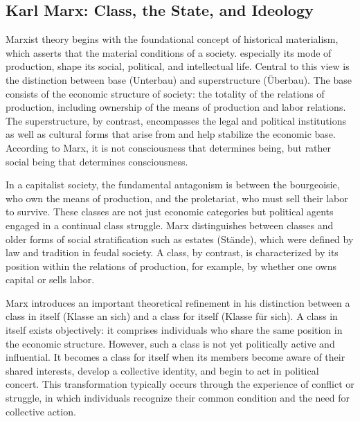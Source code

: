 \documentclass[12pt]{article}
\begin{document}
\subsection*{Karl Marx: Class, the State, and Ideology}

Marxist theory begins with the foundational concept of historical materialism, which asserts that the material conditions of a society. especially its mode of production, shape its social, political, and intellectual life. Central to this view is the distinction between base (Unterbau) and superstructure (Überbau). The base consists of the economic structure of society: the totality of the relations of production, including ownership of the means of production and labor relations. The superstructure, by contrast, encompasses the legal and political institutions as well as cultural forms that arise from and help stabilize the economic base. According to Marx, it is not consciousness that determines being, but rather social being that determines consciousness.

In a capitalist society, the fundamental antagonism is between the bourgeoisie, who own the means of production, and the proletariat, who must sell their labor to survive. These classes are not just economic categories but political agents engaged in a continual class struggle. Marx distinguishes between classes and older forms of social stratification such as estates (Stände), which were defined by law and tradition in feudal society. A class, by contrast, is characterized by its position within the relations of production, for example, by whether one owns capital or sells labor.

Marx introduces an important theoretical refinement in his distinction between a class in itself (Klasse an sich) and a class for itself (Klasse für sich). A class in itself exists objectively: it comprises individuals who share the same position in the economic structure. However, such a class is not yet politically active and influential. It becomes a class for itself when its members become aware of their shared interests, develop a collective identity, and begin to act in political concert. This transformation typically occurs through the experience of conflict or struggle, in which individuals recognize their common condition and the need for collective action.
\end{document}
